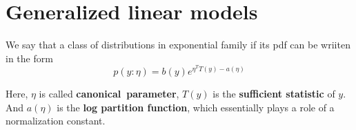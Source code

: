 \chapter{Generalized linear models}

\begin{define}
    We say that a class of distributions in exponential family if its pdf can be wriiten in the form
    \[p(y:\eta)=b(y)e^{\eta^TT(y)-a(\eta)}\]
\end{define}
Here, $\eta$ is called \textbf{canonical~parameter}, $T(y)$ is the \textbf{sufficient statistic} of $y$. And $a(\eta)$ is the \textbf{log partition function}, which essentially plays a role of a 
normalization constant. 